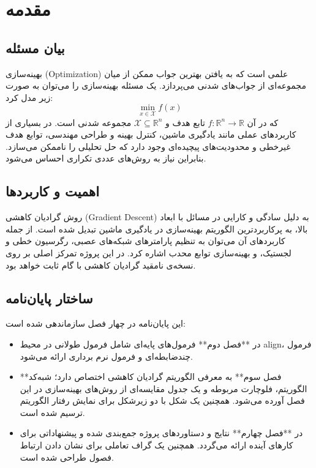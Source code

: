 \chapter{مقدمه}
\section{بیان مسئله}
بهینه‌سازی (Optimization) علمی است که به یافتن بهترین جواب ممکن از میان مجموعه‌ای از جواب‌های شدنی می‌پردازد. یک مسئله بهینه‌سازی را می‌توان به صورت زیر مدل کرد:
\begin{equation}
	\min_{x \in \mathcal{X}} f(x)
	\label{eq:opt-problem}
\end{equation}
که در آن \( f : \mathbb{R}^n \rightarrow \mathbb{R} \) تابع هدف و \( \mathcal{X} \subseteq \mathbb{R}^n \) مجموعه شدنی است. در بسیاری از کاربردهای عملی مانند یادگیری ماشین، کنترل بهینه و طراحی مهندسی، توابع هدف غیرخطی و محدودیت‌های پیچیده‌ای وجود دارد که حل تحلیلی را ناممکن می‌سازد. بنابراین نیاز به روش‌های عددی تکراری احساس می‌شود.

\section{اهمیت و کاربردها}
روش گرادیان کاهشی (Gradient Descent) به دلیل سادگی و کارایی در مسائل با ابعاد بالا، به پرکاربردترین الگوریتم بهینه‌سازی در یادگیری ماشین تبدیل شده است. از جمله کاربردهای آن می‌توان به تنظیم پارامترهای شبکه‌های عصبی، رگرسیون خطی و لجستیک، و بهینه‌سازی توابع محدب اشاره کرد. در این پروژه تمرکز اصلی بر روی نسخه‌ی نامقید گرادیان کاهشی با گام ثابت خواهد بود.

\section{ساختار پایان‌نامه}
این پایان‌نامه در چهار فصل سازماندهی شده است: 
\begin{itemize}
	\item در **فصل دوم** فرمول‌های پایه‌ای شامل فرمول طولانی در محیط align، فرمول چندضابطه‌ای و فرمول نرم برداری ارائه می‌شود.
	\item **فصل سوم** به معرفی الگوریتم گرادیان کاهشی اختصاص دارد؛ شبه‌کد الگوریتم، فلوچارت مربوطه و یک جدول مقایسه‌ای از روش‌های بهینه‌سازی در این فصل آورده می‌شود. همچنین یک شکل با دو زیرشکل برای نمایش رفتار الگوریتم ترسیم شده است.
	\item در **فصل چهارم** نتایج و دستاوردهای پروژه جمع‌بندی شده و پیشنهاداتی برای کارهای آینده ارائه می‌گردد. همچنین یک گراف تعاملی برای نشان دادن ارتباط فصول طراحی شده است.
\end{itemize}